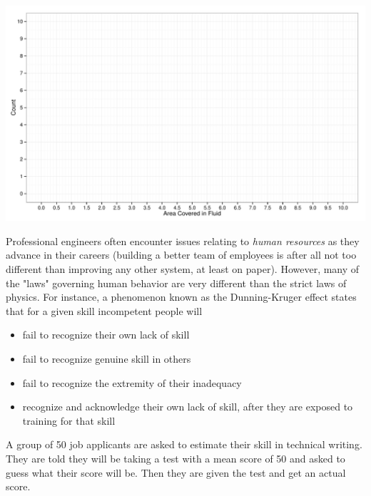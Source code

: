 \documentclass[addpoints]{examsetup}\usepackage[]{graphicx}\usepackage[]{color}
\newenvironment{knitrout}{}{} %
\begin{document}
\begin{questions}
\begin{parts}
\begin{knitrout}
\color{fgcolor}
\includegraphics[width=.8\linewidth]{figure/unnamed-chunk-6-1} 

\end{knitrout}

\end{parts}
\pagebreak

\question

Professional engineers often encounter issues relating to \textit{human resources} as they advance in their careers
(building a better team of employees is after all not too different than improving any other system, at least on paper).
However, many of the "laws" governing human behavior are very different than the strict laws of physics.
For instance, a phenomenon known as the Dunning-Kruger effect states that for a given skill incompetent people will
\begin{itemize}
   \item fail to recognize their own lack of skill
   \item fail to recognize genuine skill in others
   \item fail to recognize the extremity of their inadequacy
   \item recognize and acknowledge their own lack of skill, after they are exposed to training for that skill
\end{itemize}

A group of 50 job applicants are asked to estimate their skill in technical writing. 
They are told they will be taking a test with a mean score of 50 and asked to guess what their score will be.
Then they are given the test and get an actual score. 




\end{questions}
\end{document}
